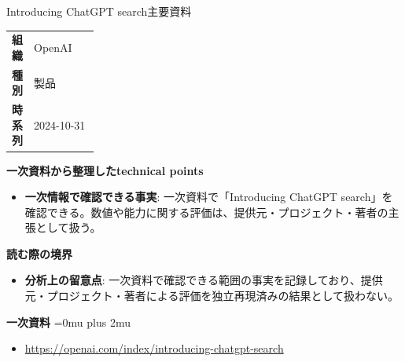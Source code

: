 \begin{technicalnote}{Introducing ChatGPT search}{主要資料}
\begingroup
\begin{tabularx}{\linewidth}{@{}>{\bfseries}p{0.22\linewidth}X@{}}
組織 & OpenAI \\
種別 & 製品 \\
時系列 & 2024-10-31 \\
\end{tabularx}
\smallskip
{\bfseries 一次資料から整理したtechnical points}
\begin{itemize}[leftmargin=1.5em,itemsep=0.35em]
\item \textbf{一次情報で確認できる事実}: 一次資料で「Introducing ChatGPT search」を確認できる。数値や能力に関する評価は、提供元・プロジェクト・著者の主張として扱う。
\end{itemize}
\begin{minipage}{\linewidth}
{\bfseries 読む際の境界}
\begin{itemize}[leftmargin=1.5em,itemsep=0.35em]
\item \textbf{分析上の留意点}: 一次資料で確認できる範囲の事実を記録しており、提供元・プロジェクト・著者による評価を独立再現済みの結果として扱わない。
\end{itemize}
\begin{samepage}
{\bfseries 一次資料}
\begingroup\sloppy
\Urlmuskip=0mu plus 2mu\relax
\begin{itemize}[leftmargin=1.5em,itemsep=0.25em]
\item {\scriptsize\url{https://openai.com/index/introducing-chatgpt-search}}
\end{itemize}
\endgroup
\end{samepage}
\end{minipage}
\endgroup
\end{technicalnote}
\medskip

